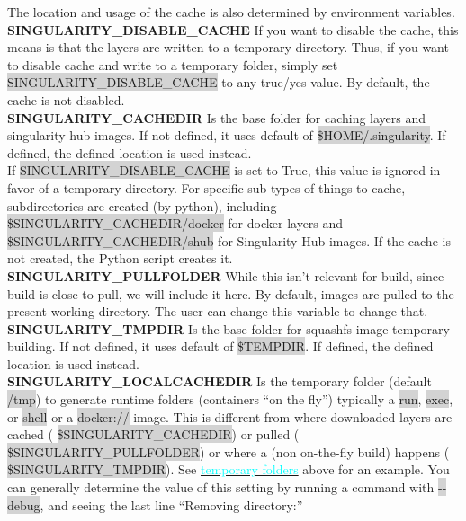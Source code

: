 \documentclass[a4paper]{article}
\begin{document}
The location and usage of the cache is also determined by environment variables.\\[0.1in]
\textbf{SINGULARITY\_DISABLE\_CACHE} If you want to disable the cache, this means is that the layers are written to a temporary directory. Thus, if you want to disable cache and write to a temporary folder, simply set  \colorbox{lightgray}{SINGULARITY\_DISABLE\_CACHE} to any true/yes value. By default, the cache is not disabled.\\[0.1in]

\textbf{SINGULARITY\_CACHEDIR} Is the base folder for caching layers and singularity hub images. If not defined, it uses default of  \colorbox{lightgray}{\$HOME/.singularity}. If defined, the defined location is used instead. \\If  \colorbox{lightgray}{SINGULARITY\_DISABLE\_CACHE} is set to True, this value is ignored in favor of a temporary directory. For specific sub-types of things to cache, subdirectories are created (by python), including  \colorbox{lightgray}{\$SINGULARITY\_CACHEDIR/docker} for docker layers and  \colorbox{lightgray}{\$SINGULARITY\_CACHEDIR/shub} for Singularity Hub images. If the cache is not created, the Python script creates it.\\[0.1in]

\textbf{SINGULARITY\_PULLFOLDER} While this isn’t relevant for build, since build is close to pull, we will include it here. By default, images are pulled to the present working directory. The user can change this variable to change that.\\[0.1in]

\textbf{SINGULARITY\_TMPDIR} Is the base folder for squashfs image temporary building. If not defined, it uses default of  \colorbox{lightgray}{\$TEMPDIR}. If defined, the defined location is used instead.\\[0.1in]

\textbf{SINGULARITY\_LOCALCACHEDIR} Is the temporary folder (default  \colorbox{lightgray}{/tmp}) to generate runtime folders (containers “on the fly”) typically a  \colorbox{lightgray}{run},  \colorbox{lightgray}{exec}, or  \colorbox{lightgray}{shell} or a  \colorbox{lightgray}{docker://} image. This is different from where downloaded layers are cached ( \colorbox{lightgray}{\$SINGULARITY\_CACHEDIR}) or pulled ( \colorbox{lightgray}{\$SINGULARITY\_PULLFOLDER}) or where a (non on-the-fly build) happens ( \colorbox{lightgray}{\$SINGULARITY\_TMPDIR}). See \hyperref[sec:temporaryfolders]{{\textcolor{cyan}{temporary folders}}} above for an example. You can generally determine the value of this setting by running a command with  \colorbox{lightgray}{-{}-debug}, and seeing the last line “Removing directory:”\\[0.1in]
\end{document}
